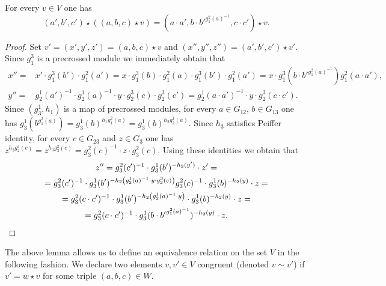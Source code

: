 \begin{lemma} For every $v \in V$ one has
\begin{equation*}(a', b', c') \star \left( (a, b, c) \star v \right) = (a \cdot a', b \cdot {b'}^{g_1^2(a)^{-1}}, c \cdot c') \star v.\end{equation*}
\end{lemma}
\begin{proof}
    Set $v'=(x', y', z') = (a, b, c) \star v$ and $(x'', y'', z'') = (a', b', c') \star v'$.
    Since $g_1^3$ is a precrossed module we immediately obtain that
    \begin{align*}
        x'' =& x' \cdot g_1^3(b') \cdot g_1^2(a') = x \cdot g_1^3(b) \cdot g_1^2(a) \cdot g_1^3(b') \cdot g_1^2(a') = x \cdot g_1^3(b \cdot b'^{g_1^2(a)^{-1}}) g_1^2(a \cdot a'),\\
        y'' =& g_2^1(a')^{-1} \cdot g_2^1(a)^{-1} \cdot y \cdot g_2^3(c) \cdot g_2^3(c') = g_2^1(a\cdot a')^{-1} \cdot y \cdot g_2^{3}(c\cdot c'). \end{align*}
    Since $(g_3^1, h_1)$ is a map of precrossed modules, for every $a \in G_{12}$, $b \in G_{13}$ one has $g_3^1(b^{g_1^2(a)}) = g_3^1(b)^{h_1 g_1^2(a)} = g_3^1(b)^{h_2g_2^1(a)}$.
    Since $h_3$ satisfies Peiffer identity, for every $c \in G_{23}$ and $z \in G_3$ one has $z ^{h_2 g_2^3(c)} = z^{ h_3 g_3^2(c)} = g_3^2(c)^{-1} \cdot z \cdot g_3^2(c)$.
    Using these identities we obtain that
    \begin{multline*}
        z'' = g_3^2(c')^{-1} \cdot g_3^1(b')^{-h_2(y')} \cdot z' = \\
        = g_3^2(c')^{-1} \cdot g_3^1(b')^{- h_2 \left( g_2^1(a)^{-1} \cdot y \cdot g_2^3(c) \right)} g_3^2(c)^{-1} \cdot g_3^1(b)^{-h_2(y)} \cdot z = \\
        = g_3^2(c \cdot c')^{-1} \cdot g_3^1(b')^{- h_2 \left( g_2^1(a)^{-1} \cdot y \right)} \cdot g_3^1(b)^{-h_2(y)} \cdot z = \\
        = g_3^2(c \cdot c')^{-1} \cdot g_3^1(b \cdot {b'} ^ {g_1^2(a)^{-1}})^{- h_2 \left( y \right)} \cdot z. \qedhere
    \end{multline*}
\end{proof}

The above lemma allows us to define an equivalence relation on the set $V$ in the following fashion.
We declare two elements $v, v' \in V$ congruent (denoted $v \sim v'$) if $v' = w \star v$ for some triple $(a, b, c) \in W$.

